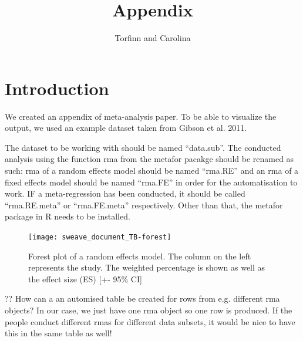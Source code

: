\documentclass[11pt, a4paper]{article} %
\begin{document}



\title{Appendix}

\author{Torfinn and Carolina}

\maketitle



\section{Introduction}%

We created an appendix of meta-analysis paper. To be able to visualize the output, we used an example dataset taken from Gibson et al. 2011.

The dataset to be working with should be named ``data.sub''. The conducted analysis using the function rma from the metafor pacakge should be renamed as such: rma of a random effects model should be named ``rma.RE'' and an rma of a fixed effects model should be named ``rma.FE'' in order for the automatisation to work. IF a meta-regression has been conducted, it should be called ``rma.RE.meta'' or ``rma.FE.meta'' respectively. Other than that, the metafor package in R needs to be installed.  





\begin{figure}
\captionsetup{width=0.6\textwidth}
\centering
\texttt{[image: sweave\_document\_TB-forest]}
\caption{Forest plot of a random effects model. The column on the left represents the study. The weighted percentage is shown as well as the effect size (ES) [+- 95\% CI]}
\label{fig:forestplot}
\end{figure}

?? How can a an automised table be created for rows from e.g. different rma objects? In our case, we just have one rma object so one row is produced. If the people conduct different rmas for different data subsets, it would be nice to have this in the same table as well!\\
\bigskip
\end{document}

